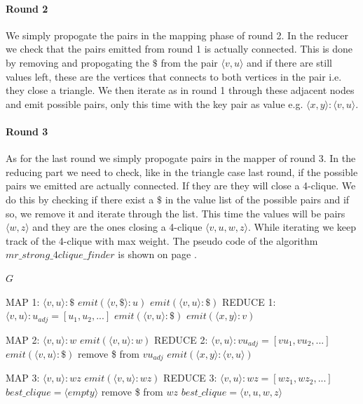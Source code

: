\documentclass{article}
\begin{document}
\paragraph{Round 2}
We simply propogate the pairs in the mapping phase of round 2. In the reducer we check that the pairs emitted from round 1 is actually connected. This is done by removing and propogating the $\$$ from the pair $\langle v,u\rangle$ and if there are still values left, these are the vertices that connects to both vertices in the pair i.e. they close a triangle. We then iterate as in round 1 through these adjacent nodes and emit possible pairs, only this time with the key pair as value e.g. $\langle x,y \rangle :\langle v,u \rangle$.

\paragraph{Round 3}
As for the last round we simply propogate pairs in the mapper of round 3. In the reducing part we need to check, like in the triangle case last round, if the possible pairs we emitted are actually connected. If they are they will close a 4-clique. We do this by checking if there exist a $\$$ in the value list of the possible pairs and if so, we remove it and iterate through the list. This time the values will be pairs $\langle w,z \rangle$ and they are the ones closing a 4-clique $\langle v,u,w,z \rangle$. While iterating we keep track of the 4-clique with max weight. The pseudo code of the algorithm $mr\_strong\_4clique\_finder$ is shown on page \pageref{mrAlgorithm}.

\begin{algorithm}
\label{mrAlgorithm}
\caption{$mr\_strong\_4clique\_finder$}
\begin{algorithmic}
\REQUIRE $G$
	
\REQUIRE MAP 1: $\langle v,u\rangle :\$$
		\STATE $emit(\langle v,\$\rangle :u)$
		\STATE $emit(\langle v,u\rangle :\$)$
	\ENDIF
\REQUIRE REDUCE 1: $\langle v,u\rangle :u_{adj} = [u_1,u_2,...]$
		\STATE $emit(\langle v,u\rangle :\$)$
	\ENDIF
				\STATE $emit(\langle x,y\rangle :v)$
			\ENDIF
		\ENDFOR
	\ENDFOR

\REQUIRE MAP 2: $\langle v,u\rangle :w$
	\STATE $emit(\langle v,u\rangle :w)$
\REQUIRE REDUCE 2: $\langle v,u\rangle : vu_{adj} = [vu_1,vu_2,...]$
		\STATE $emit(\langle v,u\rangle : \$)$
		\STATE remove \$ from $vu_{adj}$
	\ENDIF
				\STATE $emit(\langle x,y\rangle :\langle v,u\rangle)$
			\ENDIF
		\ENDFOR
	\ENDFOR

\REQUIRE MAP 3: $\langle v,u\rangle :wz$
	\STATE $emit(\langle v,u\rangle :wz)$
\REQUIRE REDUCE 3: $\langle v,u\rangle :wz = [wz_1,wz_2,...]$
	\STATE $best\_clique = \langle empty\rangle $
	\STATE remove \$ from $wz$
				\STATE $best\_clique = \langle v,u,w,z\rangle$
			\ENDIF
		\ENDFOR
	\ENDIF
\end{algorithmic}
\end{algorithm}
\end{document}
